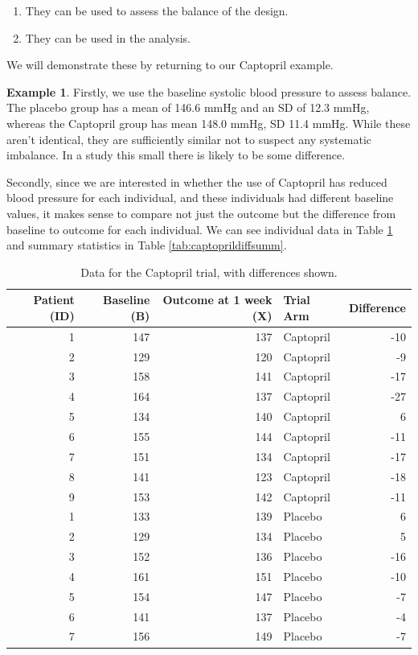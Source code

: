 \documentclass[
  openany]{book}
\providecommand{\tightlist}{%
  \setlength{\itemsep}{0pt}\setlength{\parskip}{0pt}}
\theoremstyle{definition}
\theoremstyle{definition}
\newtheorem{example}{Example}[chapter]
\theoremstyle{definition}
\theoremstyle{definition}
\theoremstyle{remark}
\begin{document}
\begin{enumerate}
\def\labelenumi{\arabic{enumi}.}
\tightlist
\item
  They can be used to assess the balance of the design.
\item
  They can be used in the analysis.
\end{enumerate}

We will demonstrate these by returning to our Captopril example.

\begin{example}
Firstly, we use the baseline systolic blood pressure to assess balance. The placebo group has a mean of 146.6 mmHg and an SD of 12.3 mmHg, whereas the Captopril group has mean 148.0 mmHg, SD 11.4 mmHg. While these aren't identical, they are sufficiently similar not to suspect any systematic imbalance. In a study this small there is likely to be some difference.

Secondly, since we are interested in whether the use of Captopril has reduced blood pressure for each individual, and these individuals had different baseline values, it makes sense to compare not just the outcome but the difference from baseline to outcome for each individual. We can see individual data in Table \ref{tab:captoprildiff} and summary statistics in Table \ref{tab:captoprildiffsumm}.

\begin{table}

\caption{\label{tab:captoprildiff}Data for the Captopril trial, with differences shown.}
\centering
\begin{tabular}[t]{r|r|r|l|r}
\hline
Patient (ID) & Baseline (B) & Outcome at 1 week (X) & Trial Arm & Difference\\
\hline
1 & 147 & 137 & Captopril & -10\\
\hline
2 & 129 & 120 & Captopril & -9\\
\hline
3 & 158 & 141 & Captopril & -17\\
\hline
4 & 164 & 137 & Captopril & -27\\
\hline
5 & 134 & 140 & Captopril & 6\\
\hline
6 & 155 & 144 & Captopril & -11\\
\hline
7 & 151 & 134 & Captopril & -17\\
\hline
8 & 141 & 123 & Captopril & -18\\
\hline
9 & 153 & 142 & Captopril & -11\\
\hline
1 & 133 & 139 & Placebo & 6\\
\hline
2 & 129 & 134 & Placebo & 5\\
\hline
3 & 152 & 136 & Placebo & -16\\
\hline
4 & 161 & 151 & Placebo & -10\\
\hline
5 & 154 & 147 & Placebo & -7\\
\hline
6 & 141 & 137 & Placebo & -4\\
\hline
7 & 156 & 149 & Placebo & -7\\
\hline
\end{tabular}
\end{table}


\end{example}
\end{document}
